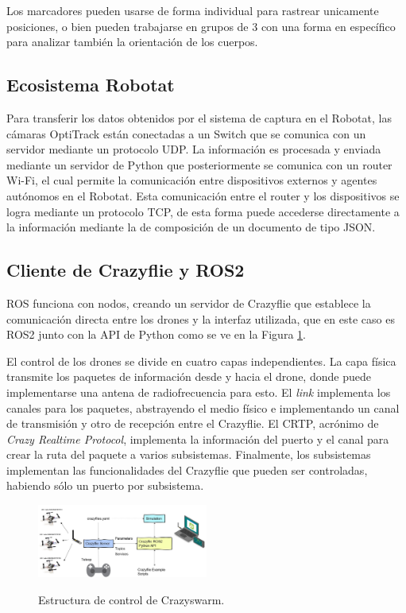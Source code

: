 Los marcadores pueden usarse de forma individual para rastrear unicamente posiciones, o bien pueden trabajarse en grupos de 3 con una forma en específico para analizar también la orientación de los cuerpos.

\subsection*{Ecosistema Robotat}

Para transferir los datos obtenidos por el sistema de captura en el Robotat, las cámaras OptiTrack están conectadas a un Switch que se comunica con un servidor mediante un protocolo UDP. La información es procesada  y enviada mediante un servidor de Python que posteriormente se comunica con un router Wi-Fi, el cual permite la comunicación entre dispositivos externos y agentes autónomos en el Robotat. Esta comunicación entre el router y los dispositivos se logra mediante un protocolo TCP, de esta forma puede accederse directamente a la información mediante la de composición de un documento de tipo JSON.

\subsection*{Cliente de Crazyflie y ROS2}

ROS funciona con nodos, creando un servidor de Crazyflie que establece la comunicación directa entre los drones y la interfaz utilizada, que en este caso es ROS2 junto con la API de Python como se ve en la Figura \ref{fig:nodos}.

El control de los drones se divide en cuatro capas independientes. La capa física transmite los paquetes de información desde y hacia el drone, donde puede implementarse una antena de radiofrecuencia para esto. El \emph{link} implementa los canales para los paquetes, abstrayendo el medio físico e implementando un canal de transmisión y otro de recepción entre el Crazyflie. El CRTP, acrónimo de \emph{Crazy Realtime Protocol}, implementa la información del puerto y el canal para crear la ruta del paquete a varios subsistemas. Finalmente, los subsistemas implementan las funcionalidades del Crazyflie que pueden ser controladas, habiendo sólo un puerto por subsistema.

\begin{figure}[t]
    \centering
    \includegraphics[width=0.5\textwidth]{figuras/overview_nodes.jpg}
    \caption{Estructura de control de Crazyswarm.}
    \cite{Crazyswarm2}
    \label{fig:nodos}
\end{figure}

